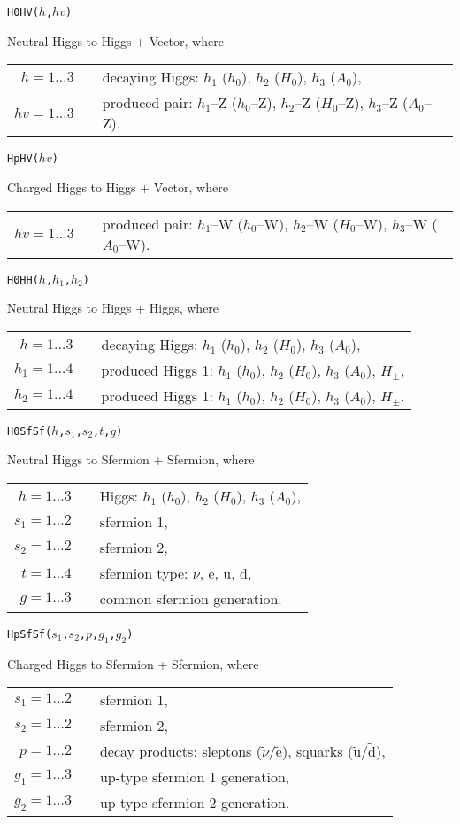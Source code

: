 \documentclass[12pt,a4paper]{report}
\newcommand{\CODE}[1]{\texttt{#1}}
\newcommand{\MACRO}[1]{\item
  \CODE{#1}\par}
\begin{document}
\MACRO{H0HV($h$,$\mathit{hv}$)}
Neutral Higgs to Higgs + Vector, where \\[.5ex]
\begin{tabular}{rcl}
  $h = 1\dots 3$ && decaying Higgs:
                    $h_1$ ($h_0$), $h_2$ ($H_0$), $h_3$ ($A_0$), \\
  $\mathit{hv} = 1\dots 3$ && produced pair:
                    $h_1$--Z ($h_0$--Z),
                    $h_2$--Z ($H_0$--Z),
                    $h_3$--Z ($A_0$--Z).
\end{tabular}

\MACRO{HpHV($\mathit{hv}$)}
Charged Higgs to Higgs + Vector, where \\[.5ex]
\begin{tabular}{rcl}
  $\mathit{hv} = 1\dots 3$ && produced pair:
                    $h_1$--W ($h_0$--W),
                    $h_2$--W ($H_0$--W),
                    $h_3$--W ($A_0$--W).
\end{tabular}

\MACRO{H0HH($h$,$h_1$,$h_2$)}
Neutral Higgs to Higgs + Higgs, where \\[.5ex]
\begin{tabular}{rcl}
  $h = 1\dots 3$ && decaying Higgs:
                    $h_1$ ($h_0$), $h_2$ ($H_0$), $h_3$ ($A_0$), \\
  $h_1 = 1\dots 4$ && produced Higgs 1:
                    $h_1$ ($h_0$), $h_2$ ($H_0$), $h_3$ ($A_0$), $H_\pm$, \\
  $h_2 = 1\dots 4$ && produced Higgs 1:
                    $h_1$ ($h_0$), $h_2$ ($H_0$), $h_3$ ($A_0$), $H_\pm$.
\end{tabular}

\MACRO{H0SfSf($h$,$s_1$,$s_2$,$t$,$g$)}
Neutral Higgs to Sfermion + Sfermion, where \\[.5ex]
\begin{tabular}{rcl}
  $h = 1\dots 3$ && Higgs:
                    $h_1$ ($h_0$), $h_2$ ($H_0$), $h_3$ ($A_0$), \\
  $s_1 = 1\dots 2$ && sfermion 1, \\
  $s_2 = 1\dots 2$ && sfermion 2, \\
  $t = 1\dots 4$ && sfermion type: $\nu$, e, u, d, \\
  $g = 1\dots 3$ && common sfermion generation.
\end{tabular}

\MACRO{HpSfSf($s_1$,$s_2$,$p$,$g_1$,$g_2$)}
Charged Higgs to Sfermion + Sfermion, where \\[.5ex]
\begin{tabular}{rcl}
  $s_1 = 1\dots 2$ && sfermion 1, \\
  $s_2 = 1\dots 2$ && sfermion 2, \\
  $p = 1\dots 2$ && decay products:
                    sleptons ($\tilde\nu$/$\mathrm{\tilde e}$),
                    squarks ($\mathrm{\tilde u}$/$\mathrm{\tilde d}$), \\
  $g_1 = 1\dots 3$ && up-type sfermion 1 generation, \\
  $g_2 = 1\dots 3$ && up-type sfermion 2 generation.
\end{tabular}
\end{document}
